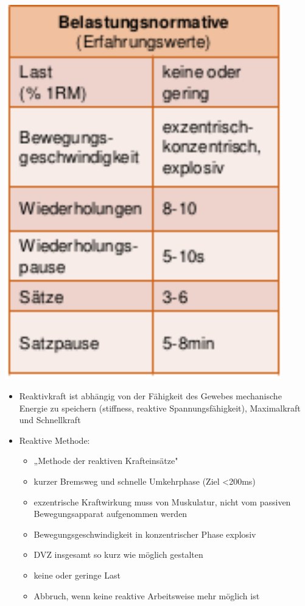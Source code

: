 \begin{minipage}{0.3\textwidth}
    \includegraphics[width=0.9\textwidth]{pictures/reaktive_methode}
\end{minipage}
\begin{minipage}{0.7\textwidth}
    \begin{itemize}
        \item Reaktivkraft ist abhängig von der Fähigkeit des Gewebes mechanische Energie zu speichern (stiffness, reaktive Spannungsfähigkeit), Maximalkraft und Schnellkraft
        \item Reaktive Methode:
        \begin{itemize}
            \item „Methode der reaktiven Krafteinsätze"
            \item kurzer Bremsweg und schnelle Umkehrphase (Ziel <200ms)
            \item exzentrische Kraftwirkung muss von Muskulatur, nicht vom passiven Bewegungsapparat aufgenommen werden
            \item Bewegungsgeschwindigkeit in konzentrischer Phase explosiv
            \item DVZ insgesamt so kurz wie möglich gestalten
            \item keine oder geringe Last
            \item Abbruch, wenn keine reaktive Arbeitsweise mehr möglich ist
        \end{itemize}
    \end{itemize}
\end{minipage}

